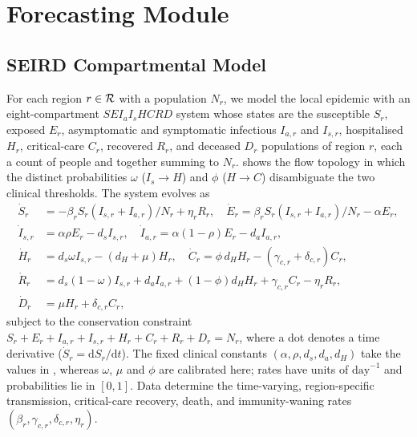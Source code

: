 \section{Forecasting Module}\label{sec:forecasting}

\subsection{SEIRD Compartmental Model}\label{ssec:seird}

For each region $r \in \mathcal{R}$ with a population $N_r$, we model the local
epidemic with an eight-compartment $SEI_aI_sHCRD$ system whose states
are the susceptible $S_r$, exposed $E_r$, asymptomatic and symptomatic
infectious $I_{a,r}$ and $I_{s,r}$, hospitalised $H_r$, critical-care
$C_r$, recovered $R_r$, and deceased $D_r$ populations of region $r$,
each a count of people and together summing to $N_r$. 
shows the flow topology in which the distinct probabilities $\omega$
($I_s\!\to\!H$) and $\phi$ ($H\!\to\!C$) disambiguate the two clinical
thresholds. The system evolves as
\begin{equation}\label{eq:seird}
\begin{aligned}
\dot{S}_r     &= -\beta_r S_r (I_{s,r}+I_{a,r})/N_r + \eta_r R_r, \quad
\dot{E}_r      = \beta_r S_r (I_{s,r}+I_{a,r})/N_r - \alpha E_r, \\
\dot{I}_{s,r} &= \alpha\rho E_r - d_s I_{s,r}, \quad
\dot{I}_{a,r}  = \alpha(1-\rho)E_r - d_a I_{a,r}, \\
\dot{H}_r     &= d_s\omega I_{s,r} - (d_H + \mu) H_r, \quad
\dot{C}_r      = \phi\, d_H H_r - (\gamma_{c,r}+\delta_{c,r}) C_r, \\
\dot{R}_r     &= d_s(1{-}\omega)I_{s,r} + d_a I_{a,r}
                + (1{-}\phi)d_H H_r + \gamma_{c,r}C_r - \eta_r R_r, \\
\dot{D}_r     &= \mu H_r + \delta_{c,r} C_r,
\end{aligned}
\end{equation}
subject to the conservation constraint
$S_r + E_r + I_{a,r} + I_{s,r} + H_r + C_r + R_r + D_r = N_r$, where a
dot denotes a time derivative ($\dot S_r = \mathrm{d}S_r/\mathrm{d}t$).
The fixed clinical constants $(\alpha,\rho,d_s,d_a,d_H)$ take the values
in \cite[Table~1]{ajao2025hybrid}, whereas $\omega$, $\mu$ and $\phi$ are
calibrated here; rates have units of
$\text{day}^{-1}$ and probabilities lie in $[0,1]$. Data determine the
time-varying, region-specific transmission, critical-care recovery,
death, and immunity-waning rates
$(\beta_r,\gamma_{c,r},\delta_{c,r},\eta_r)$.

